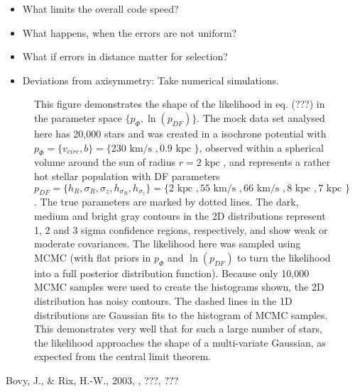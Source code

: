 \documentclass[12pt,preprint]{aastex}
\begin{document}
\begin{itemize}
\item What limits the overall code speed?
\item What happens, when the errors are not uniform?
\item What if errors in distance matter for selection?
\item Deviations from axisymmetry: Take numerical simulations.
\end{itemize}



\begin{figure}
\caption{This figure demonstrates the shape of the likelihood in eq. (???) in the parameter space $\{p_\Phi,\ln(p_{DF})\}$. The mock data set analysed here has 20,000 stars and was created in a isochrone potential with $p_\Phi = \{v_{circ},b \}=\{230 \text{ km/s },0.9\text{ kpc } \}$, observed within a spherical volume around the sun of radius $r = 2 \text{ kpc }$, and represents a rather hot stellar population with DF parameters $p_{DF} = \{ h_R, \sigma_R, \sigma_z,h_{\sigma_R},h_{\sigma_z}\} =\{2 \text{ kpc }, 55 \text{ km/s }, 66 \text{ km/s }, 8 \text{ kpc }, 7 \text{ kpc }\} $.  The true parameters are marked by dotted lines. The dark, medium and bright gray contours in the 2D distributions represent 1, 2 and 3 sigma confidence regions, respectively, and show weak or moderate covariances. The likelihood here was sampled using MCMC (with flat priors in $p_\Phi$ and  $\ln(p_{DF})$ to turn the likelihood into a full posterior distribution function). Because only 10,000 MCMC samples were used to create the histograms shown, the 2D distribution has noisy contours. The dashed lines in the 1D distributions are Gaussian fits to the histogram of MCMC samples. This demonstrates very well that for such a large number of stars, the likelihood approaches the shape of a multi-variate Gaussian, as expected from the central limit theorem.}
\end{figure}



\begin{thebibliography}{}
 Bovy, J., \& Rix, H.-W., 2003, \apj, ???, ???
\end{thebibliography}
\end{document}
